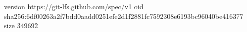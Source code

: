 version https://git-lfs.github.com/spec/v1
oid sha256:6df00263a2f7bdd0aadd0251efe2d1f2881fc7592308e6193bc96040be416377
size 349692
